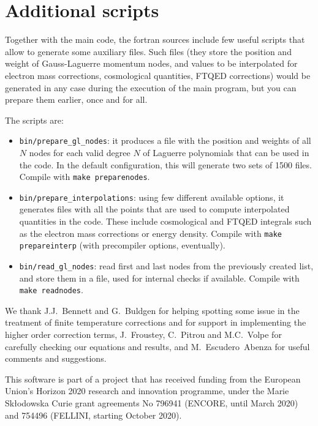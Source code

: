 \documentclass[notitlepage,nofootinbib,showpacs,preprintnumbers,amsmath,amssymb,superscriptaddress,prd,onecolumn]{revtex4-1}
\begin{document}
\section{Additional scripts}
\label{ssec:scripts}
Together with the main code, the fortran sources include few useful scripts that allow to generate some auxiliary files.
Such files (they store the position and weight of Gauss-Laguerre momentum nodes, and values to be interpolated for electron mass corrections, cosmological quantities, FTQED corrections) would be generated in any case during the execution of the main program, but you can prepare them earlier, once and for all.

The scripts are:
\begin{itemize}
\item \texttt{bin/prepare\_gl\_nodes}:
it produces a file with the position and weights of all $N$ nodes for each valid degree $N$ of Laguerre polynomials that can be used in the code.
In the default configuration, this will generate two sets of 1500 files.
Compile with \texttt{make preparenodes}.
\item \texttt{bin/prepare\_interpolations}: using few different available options,
it generates files with all the points that are used to compute interpolated quantities in the code.
These include cosmological and FTQED integrals such as the electron mass corrections or energy density.
Compile with \texttt{make prepareinterp} (with precompiler options, eventually).
\item \texttt{bin/read\_gl\_nodes}: read first and last nodes from the previously created list, and store them in a file, used for internal checks if available. Compile with \texttt{make readnodes}.
\end{itemize}



\acknowledgments
We thank J.J.~Bennett and G.~Buldgen for helping spotting
some issue in the treatment of finite temperature corrections
and for support in implementing the higher order correction terms,
J.~Froustey, C.~Pitrou and M.C.~Volpe for carefully checking our equations and results,
and M.~Escudero~Abenza for useful comments and suggestions.

This software is part of a project that has received funding from the European Union's Horizon 2020 research and innovation programme, under the Marie Sk{\l}odowska Curie grant agreements No
796941 (ENCORE, until March 2020) and
754496 (FELLINI, starting October 2020).




\end{document}
